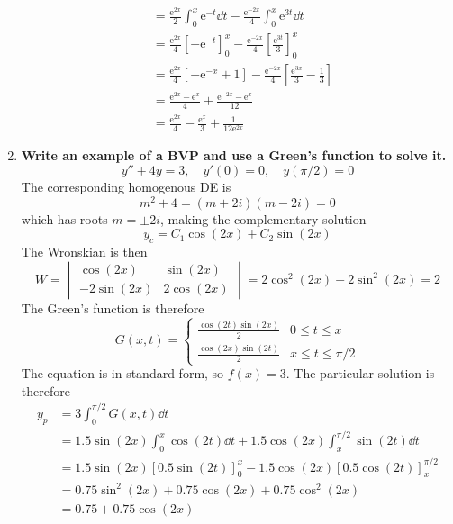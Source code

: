 \documentclass[12pt]{article}
\newcommand{\en}{\text{e}}
\begin{document}
\begin{enumerate}
\begin{align*}
						&= \frac{\en^{2x}}{2}\int_0^x\en^{-t}\dd{t} - \frac{\en^{-2x}}{4}\int_0^x\en^{3t}\dd{t} \\
						&= \frac{\en^{2x}}{4}\left[-\en^{-t}\right]_0^x - \frac{\en^{-2x}}{4}\left[\frac{\en^{3t}}{3}\right]_0^x \\
						&= \frac{\en^{2x}}{4}\left[-\en^{-x}  + 1\right] - \frac{\en^{-2x}}{4}\left[\frac{\en^{3x}}{3} - \frac{1}{3}\right] \\
						&= \frac{\en^{2x} - \en^x}{4} + \frac{\en^{-2x} - \en^{x}}{12} \\
						&= \frac{\en^{2x}}{4} - \frac{\en^{x}}{3} + \frac{1}{12\en^{2x}}
				\end{align*}
		\item \textbf{Write an example of a BVP and use a Green's function to solve it.}
			\[y'' + 4y = 3, \quad y'(0) = 0, \quad y(\pi / 2) = 0\]
				The corresponding homogenous DE is
				\[m^2 + 4 = (m + 2i)(m -2i) = 0\]
				which has roots \(m = \pm 2i\), making the complementary solution
				\[y_c = C_1\cos(2x) + C_2\sin(2x)\]
				The Wronskian is then
				\[
					W = \begin{vmatrix}
						\cos(2x) & \sin(2x) \\
						-2\sin(2x) & 2\cos(2x)
					\end{vmatrix} = 2\cos^2(2x) + 2\sin^2(2x) = 2
				\]
				The Green's function is therefore
				\[
					G(x, t) = \begin{cases}
						\frac{\cos(2t)\sin(2x)}{2} & 0 \le t \le x \\
						\frac{\cos(2x)\sin(2t)}{2} & x \le t \le \pi/2
					\end{cases}
				\]
				The equation is in standard form, so \(f(x) = 3\). The particular solution is therefore
				\begin{align*}
					y_p &= 3\int_0^{\pi/2} G(x, t) \dd{t} \\
						&= 1.5\sin(2x)\int_0^x\cos(2t)\dd{t} + 1.5\cos(2x)\int_x^{\pi/2}\sin(2t)\dd{t} \\
						&= 1.5\sin(2x)[0.5\sin(2t)]_0^x - 1.5\cos(2x)[0.5\cos(2t)]_x^{\pi/2} \\
						&= 0.75\sin^2(2x) + 0.75\cos(2x) + 0.75\cos^2(2x) \\
						&= 0.75 + 0.75\cos(2x)
				\end{align*}
	\end{enumerate}
\end{document}
